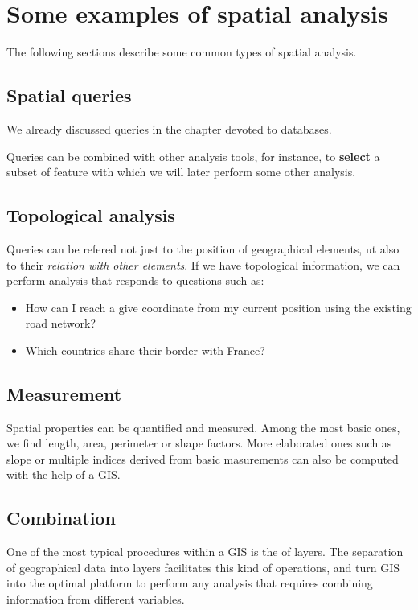 \section{Some examples of spatial analysis}

The following sections describe some common types of spatial analysis.

\subsection{Spatial queries}

We already discussed queries in the chapter devoted to databases.

Queries can be combined with other analysis tools, for instance, to \textbf{select} a subset of feature with which we will later perform some other analysis.

\subsection{Topological analysis}

Queries can be refered not just to the position of geographical elements, ut also to their \emph{relation with other elements}. If we have topological information, we can perform analysis that responds to questions such as:

\begin{itemize}
\item How can I reach a give coordinate from my current position using the existing road network? 

\item Which countries share their border with France?
\end{itemize}

\subsection{Measurement} 

Spatial properties can be quantified and measured. Among the most basic ones, we find length, area, perimeter or shape factors. More elaborated ones such as slope or multiple indices derived from basic masurements can also be computed with the help of a GIS.


\subsection{Combination}

One of the most typical procedures within a GIS is the  of layers. The separation of geographical data into layers facilitates this kind of operations, and turn GIS into the optimal platform to perform any analysis that requires combining information from different variables.

